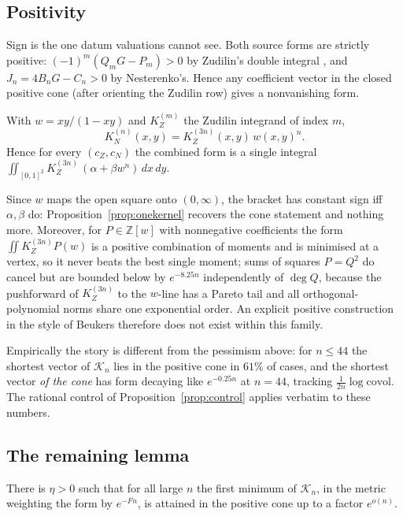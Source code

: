 \subsection{Positivity}

Sign is the one datum valuations cannot see. Both source forms are strictly positive: $(-1)^m(Q_mG-P_m)>0$ by Zudilin's double integral \cite{Zud02a}, and $J_n=4B_nG-C_n>0$ by Nesterenko's. Hence any coefficient vector in the closed positive cone (after orienting the Zudilin row) gives a nonvanishing form.

\begin{proposition}\label{prop:onekernel}
With $w=xy/(1-xy)$ and $K^{(m)}_Z$ the Zudilin integrand of index $m$,
\[
K^{(n)}_N(x,y)=K^{(3n)}_Z(x,y)\,w(x,y)^n .
\]
Hence for every $(c_Z,c_N)$ the combined form is a single integral $\iint_{[0,1]^2}K^{(3n)}_Z\,(\alpha+\beta w^n)\,dx\,dy$.
\end{proposition}
Since $w$ maps the open square onto $(0,\infty)$, the bracket has constant sign iff $\alpha,\beta$ do: Proposition~\ref{prop:onekernel} recovers the cone statement and nothing more. Moreover, for $P\in\mathbb Z[w]$ with nonnegative coefficients the form $\iint K^{(3n)}_ZP(w)$ is a positive combination of moments and is minimised at a vertex, so it never beats the best single moment; sums of squares $P=Q^2$ do cancel but are bounded below by $e^{-8.25n}$ independently of $\deg Q$, because the pushforward of $K^{(3n)}_Z$ to the $w$-line has a Pareto tail and all orthogonal-polynomial norms share one exponential order. An explicit positive construction in the style of Beukers therefore does not exist within this family.

Empirically the story is different from the pessimism above: for $n\le44$ the shortest vector of $\mathcal K_n$ lies in the positive cone in $61\%$ of cases, and the shortest vector \emph{of the cone} has form decaying like $e^{-0.25n}$ at $n=44$, tracking $\tfrac1{2n}\log\mathrm{covol}$. The rational control of Proposition~\ref{prop:control} applies verbatim to these numbers.

\subsection{The remaining lemma}

\begin{lemma*}[P2]
There is $\eta>0$ such that for all large $n$ the first minimum of $\mathcal K_n$, in the metric weighting the form by $e^{-Fn}$, is attained in the positive cone up to a factor $e^{o(n)}$.
\end{lemma*}

